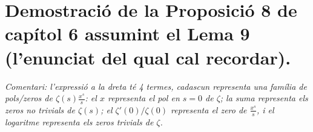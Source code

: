 \documentclass{report}
\begin{document}
\chapter{Demostració de la Proposició 8 de capítol 6 assumint el Lema 9 (l'enunciat del qual cal recordar).}
\textit{Comentari: l'expressió a la dreta té 4 termes, cadascun representa una família de pols/zeros de $\zeta(s)\frac{x^s}{s}$: el $x$ representa el pol en $s=0$ de $\zeta$; la suma representa els zeros no trivials de $\zeta(s)$; el $\zeta'(0)/\zeta(0)$ representa el zero de $\frac{x^s}{s}$, i el logaritme representa els zeros trivials de $\zeta$.}
\end{document}

